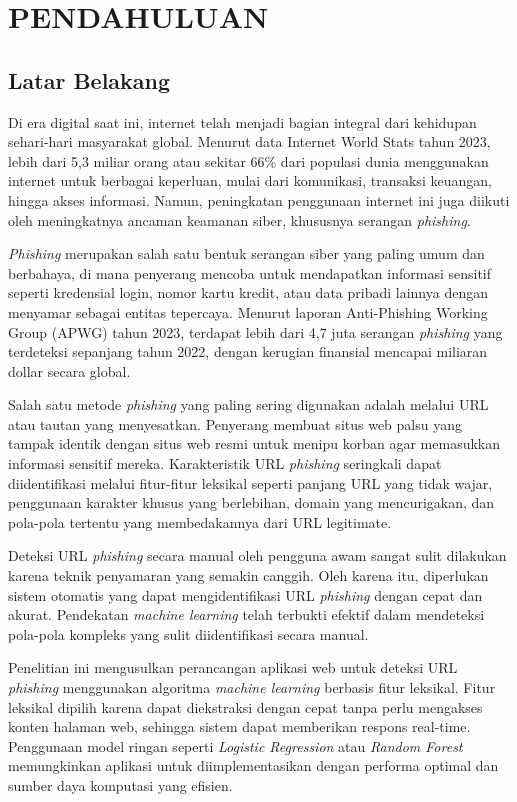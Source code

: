 \chapter{PENDAHULUAN}

\section{Latar Belakang}

Di era digital saat ini, internet telah menjadi bagian integral dari kehidupan sehari-hari masyarakat global. Menurut data Internet World Stats tahun 2023, lebih dari 5,3 miliar orang atau sekitar 66\% dari populasi dunia menggunakan internet untuk berbagai keperluan, mulai dari komunikasi, transaksi keuangan, hingga akses informasi. Namun, peningkatan penggunaan internet ini juga diikuti oleh meningkatnya ancaman keamanan siber, khususnya serangan \textit{phishing}.

\textit{Phishing} merupakan salah satu bentuk serangan siber yang paling umum dan berbahaya, di mana penyerang mencoba untuk mendapatkan informasi sensitif seperti kredensial login, nomor kartu kredit, atau data pribadi lainnya dengan menyamar sebagai entitas tepercaya. Menurut laporan Anti-Phishing Working Group (APWG) tahun 2023, terdapat lebih dari 4,7 juta serangan \textit{phishing} yang terdeteksi sepanjang tahun 2022, dengan kerugian finansial mencapai miliaran dollar secara global.

Salah satu metode \textit{phishing} yang paling sering digunakan adalah melalui URL atau tautan yang menyesatkan. Penyerang membuat situs web palsu yang tampak identik dengan situs web resmi untuk menipu korban agar memasukkan informasi sensitif mereka. Karakteristik URL \textit{phishing} seringkali dapat diidentifikasi melalui fitur-fitur leksikal seperti panjang URL yang tidak wajar, penggunaan karakter khusus yang berlebihan, domain yang mencurigakan, dan pola-pola tertentu yang membedakannya dari URL legitimate.

Deteksi URL \textit{phishing} secara manual oleh pengguna awam sangat sulit dilakukan karena teknik penyamaran yang semakin canggih. Oleh karena itu, diperlukan sistem otomatis yang dapat mengidentifikasi URL \textit{phishing} dengan cepat dan akurat. Pendekatan \textit{machine learning} telah terbukti efektif dalam mendeteksi pola-pola kompleks yang sulit diidentifikasi secara manual.

Penelitian ini mengusulkan perancangan aplikasi web untuk deteksi URL \textit{phishing} menggunakan algoritma \textit{machine learning} berbasis fitur leksikal. Fitur leksikal dipilih karena dapat diekstraksi dengan cepat tanpa perlu mengakses konten halaman web, sehingga sistem dapat memberikan respons real-time. Penggunaan model ringan seperti \textit{Logistic Regression} atau \textit{Random Forest} memungkinkan aplikasi untuk diimplementasikan dengan performa optimal dan sumber daya komputasi yang efisien.


